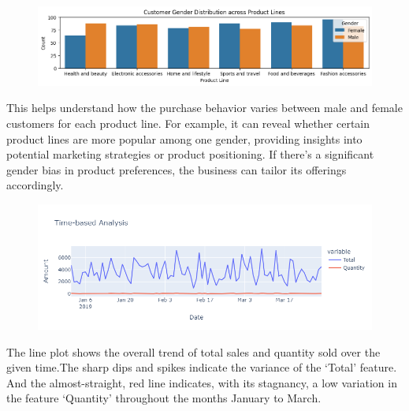 

\begin{figure}[h]
    \centering
    \includegraphics[width=1\textwidth]{Chapters/ch1/ch_1_barchart_1.png}
\end{figure}

This helps understand how the purchase behavior varies between male and female customers for each product line. For example, it can reveal whether certain product lines are more popular among one gender, providing insights into potential marketing strategies or product positioning. If there's a significant gender bias in product preferences, the business can tailor its offerings accordingly.





\begin{figure}[h]
    \centering
    \includegraphics[width=1\textwidth]{Chapters/ch1/ch_1_timeseries_1.png}
\end{figure}
The line plot shows the overall trend of total sales and quantity sold over the given time.The sharp dips and spikes indicate the variance of the ‘Total’ feature. And the almost-straight, red line indicates, with its stagnancy, a low variation in the feature ‘Quantity’ throughout the months January to March.


